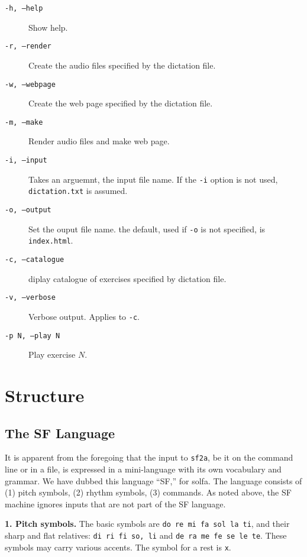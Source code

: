 \documentclass[11pt]{amsart}
\newcommand{\strong}[1]{{\bf #1}}
\begin{document}
\begin{description}

  \item[{\tt -h, --help}] Show help.
  
  \item[{\tt -r, --render}] Create the audio files specified by the 
  dictation  file.
  
  \item[{\tt -w, --webpage}] Create the web page specified by the 
  dictation file.
  
  \item[{\tt -m, --make}] Render audio files and make web page.
  
  
  \item[{\tt -i, --input}] Takes an arguemnt, the input file name.
  If the {\tt -i} option is not used, {\tt dictation.txt} is assumed.
  
  \item[{\tt -o, --output}] Set the ouput file name.  the default, 
  used if {\tt -o} is not specified, is {\tt index.html}.
  
  \item[{\tt -c, --catalogue}] diplay catalogue of exercises specified by
  dictation file.
  
  \item[{\tt -v, --verbose}] Verbose output.  Applies to {\tt -c}.
  
   \item[{\tt -p N, --play N}] Play exercise $N$.

\end{description}

\section{Structure}

\subsection{The SF Language}

It is apparent from the foregoing that the input to {\tt sf2a}, be it 
on the command line or in a file, is  expressed in a mini-language with its
own vocabulary and grammar.  We have dubbed this language ``SF,'' for solfa.
The language consists of (1) pitch symbols, (2) rhythm symbols, (3) commands.
As noted above, the SF machine ignores inputs that are not part of the SF language.


\strong{1. Pitch symbols.}  The basic symbols are {\tt do re mi fa sol la ti}, and their
sharp and flat relatives: {\tt di ri fi so, li} and {\tt de ra me fe se le te}.
These symbols may carry various accents.  The symbol for a rest is {\tt x}.
\end{document}
